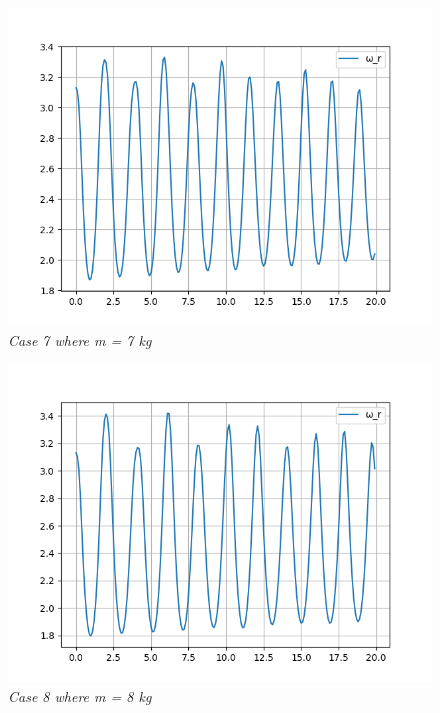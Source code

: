         \begin{figure}[H]
            \centering
            \includegraphics{Appendix/RExpPictures/F/fm7.png}
            \caption{\textit{Case 7 where m = 7 kg}}
            \label{}
        \end{figure}
            
        \begin{figure}[H]
            \centering
            \includegraphics{Appendix/RExpPictures/F/fm8.png}
            \caption{\textit{Case 8 where m = 8 kg}}
            \label{}
        \end{figure}
            
